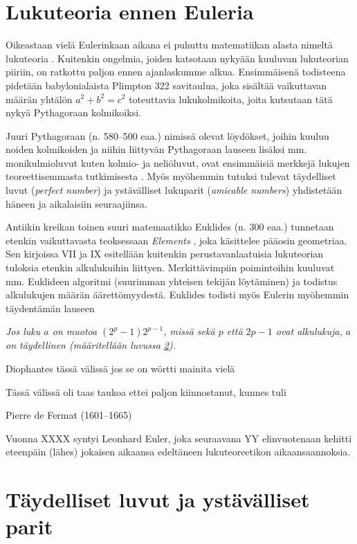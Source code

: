 \documentclass[a4paper,11pt]{article}
\begin{document}
\section{Lukuteoria ennen Euleria}
\label{kakkoi}

Oikeastaan vielä Eulerinkaan aikana ei puhuttu matematiikan alasta nimeltä lukuteoria \cite{Karatsuba}. Kuitenkin ongelmia, joiden katsotaan nykyään kuuluvan lukuteorian piiriin, on ratkottu paljon ennen ajanlaskumme alkua. Ensimmäisenä todisteena pidetään babylonialaista Plimpton 322 savitaulua, joka sisältää vaikuttavan määrän yhtälön $a^2+b^2=c^2$ toteuttavia lukukolmikoita, joita kutsutaan tätä nykyä Pythagoraan kolmikoiksi.

Juuri Pythagoraan (n. 580–500 eaa.) nimissä olevat löydökset, joihin kuuluu noiden kolmikoiden ja niihin liittyvän Pythagoraan lauseen lisäksi mm. monikulmioluvut kuten kolmio- ja neliöluvut, ovat ensimmäisiä merkkejä lukujen teoreettisemmasta tutkimisesta \cite{Burton}. Myös myöhemmin tutuksi tulevat täydelliset luvut (\textit{perfect number}) ja ystävälliset lukuparit (\textit{amicable numbers}) yhdistetään häneen ja aikalaisiin seuraajiinsa.

Antiikin kreikan toinen suuri matemaatikko Euklides (n. 300 eaa.) tunnetaan etenkin vaikuttavasta teoksessaan \textit{Elements} \cite{Elements}, joka käsittelee pääosin geometriaa. Sen kirjoissa VII ja IX esitellään kuitenkin perustavanlaatuisia lukuteorian tuloksia etenkin alkulukuihin liittyen. Merkittävimpiin poimintoihin kuuluvat mm. Euklideen algoritmi (suurimman yhteisen tekijän löytäminen) ja todistus alkulukujen määrän äärettömyydestä. Euklides todisti myös Eulerin myöhemmin täydentämän lauseen

\begin{center}
    \textit{Jos luku $a$ on muotoa $(2^p-1)2^{p-1}$, missä sekä $p$ että $2p-1$ ovat alkulukuja, $a$ on täydellinen (määritellään luvussa \ref{kolmoi}).}
\end{center}

Diophantes tässä välissä jos se on wörtti mainita vielä

Tässä välissä oli taas taukoa ettei paljon kiinnostanut, kunnes tuli

Pierre de Fermat (1601–1665) 

Vuonna XXXX syntyi Leonhard Euler, joka seuraavana YY elinvuotenaan kehitti eteenpäin (lähes) jokaisen aikaansa edeltäneen lukuteoreetikon aikaansaannoksia.

\section{Täydelliset luvut ja ystävälliset parit}
\label{kolmoi}
\end{document}
